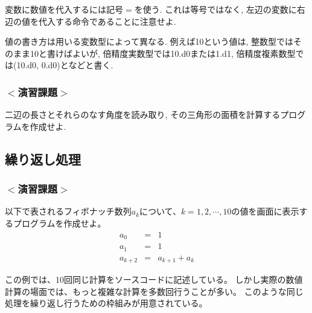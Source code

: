 \documentclass[a4j]{jsarticle}
\begin{document}
変数に数値を代入するには記号$=$を使う. 
これは等号ではなく, 左辺の変数に右辺の値を代入する命令であることに注意せよ. 

値の書き方は用いる変数型によって異なる. 
例えば10という値は, 整数型ではそのまま10と書けばよいが, 
倍精度実数型では10.d0または1.d1, 倍精度複素数型では(10.d0, 0.d0)となどと書く. \\

\subsubsection*{$<$演習課題$>$}
二辺の長さとそれらのなす角度を読み取り, その三角形の面積を計算するプログラムを作成せよ. \\

\subsection{繰り返し処理}
\subsubsection*{$<$演習課題$>$}
以下で表されるフィボナッチ数列$a_k$について、$k=1,2, \cdots, 10$の値を画面に表示するプログラムを作成せよ。 \\
\begin{eqnarray}
a_0 &=& 1 \\
a_1 &=& 1 \\
a_{k+2} &=& a_{k+1} + a_k
\end{eqnarray}

この例では、10回同じ計算をソースコードに記述している。
しかし実際の数値計算の場面では、もっと複雑な計算を多数回行うことが多い。
このような同じ処理を繰り返し行うための枠組みが用意されている。


\end{document}
